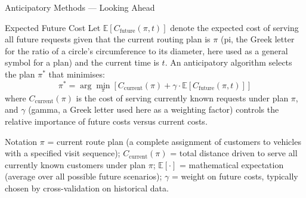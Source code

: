 \documentclass[aspectratio=169,10pt]{beamer}
\begin{document}
\begin{frame}[allowframebreaks]{Anticipatory Methods — Looking Ahead}
  \begin{block}{Expected Future Cost}
    Let $\mathbb{E}[C_{\mathrm{future}}(\pi, t)]$ denote the expected cost of
    serving all future requests given that the current routing plan is $\pi$
    (pi, the Greek letter for the ratio of a circle's circumference to its
    diameter, here used as a general symbol for a plan) and the current time
    is $t$.  An anticipatory algorithm selects the plan $\pi^*$ that minimises:
    \[
      \pi^* = \arg\min_{\pi} \left[C_{\mathrm{current}}(\pi) +
              \gamma \cdot \mathbb{E}[C_{\mathrm{future}}(\pi, t)]\right]
    \]
    where $C_{\mathrm{current}}(\pi)$ is the cost of serving currently known
    requests under plan $\pi$, and $\gamma$ (gamma, a Greek letter used here
    as a weighting factor) controls the relative importance of future costs
    versus current costs.
  \end{block}

  \begin{block}{Notation}
    $\pi$ = current route plan (a complete assignment of customers to vehicles
    with a specified visit sequence); $C_{\mathrm{current}}(\pi)$ = total
    distance driven to serve all currently known customers under plan $\pi$;
    $\mathbb{E}[\cdot]$ = mathematical expectation (average over all possible
    future scenarios); $\gamma$ = weight on future costs, typically chosen by
    cross-validation on historical data.
  \end{block}

\end{frame}
\end{document}

